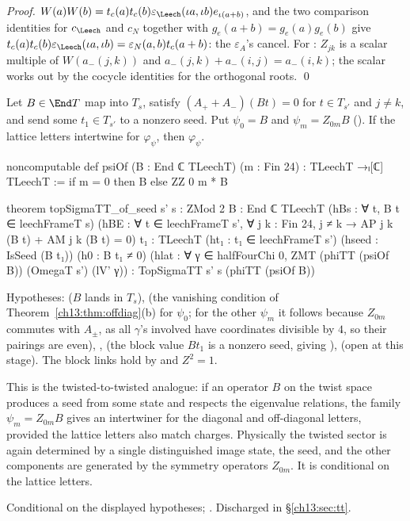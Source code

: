 \noindent\emph{Proof.} $W(a)W(b)=t_c(a)t_c(b)\varepsilon_\Leech(\iota a,\iota b)e_{\iota(a+b)}$, and the two
comparison identities for $c_\Leech$ and $c_N$ together with $g_e(a+b)=g_e(a)g_e(b)$ give
$t_c(a)t_c(b)\varepsilon_\Leech(\iota a,\iota b)=\varepsilon_N(a,b)t_c(a+b)$: the $\varepsilon_A$'s cancel. For : $Z_{jk}$
is a scalar multiple of $W(a_-(j,k))$ and $a_-(j,k)+a_-(i,j)=a_-(i,k)$; the scalar works out by the
cocycle identities for the orthogonal roots. \qed

\begin{theorem}\label{ch13:thm:TT-seed}
Let $B\in\End T$ map into $T_s$, satisfy $(A_++A_-)(B t)=0$ for $t\in T_{s'}$ and $j\neq k$, and send some
$t_1\in T_{s'}$ to a nonzero seed. Put $\psi_0=B$ and $\psi_m=Z_{0m}B$ (). If the lattice
letters intertwine for $\varphi_\psi$, then  $\varphi_\psi$.
\end{theorem}
\begin{leancode}
noncomputable def psiOf (B : End ℂ TLeechT) (m : Fin 24) : TLeechT →ₗ[ℂ] TLeechT :=
  if m = 0 then B else ZZ 0 m * B

theorem topSigmaTT_of_seed {s' s : ZMod 2} {B : End ℂ TLeechT} (hBs : ∀ t, B t ∈ leechFrameT s)
    (hBE : ∀ t ∈ leechFrameT s', ∀ j k : Fin 24, j ≠ k → AP j k (B t) + AM j k (B t) = 0)
    {t₁ : TLeechT} (ht₁ : t₁ ∈ leechFrameT s') (hseed : IsSeed (B t₁)) (h0 : B t₁ ≠ 0)
    (hlat : ∀ γ ∈ halfFourChi 0, ZMT (phiTT (psiOf B)) (OmegaT s') (lV' γ)) :
    TopSigmaTT s' s (phiTT (psiOf B))
\end{leancode}
\begin{dictionary}
Hypotheses:  ($B$ lands in $T_s$),  (the vanishing condition of
Theorem~\ref{ch13:thm:offdiag}(b) for $\psi_0$; for the other $\psi_m$ it follows because $Z_{0m}$
commutes with $A_\pm$, as all $\gamma$'s involved have coordinates divisible by $4$, so their pairings are
even), ,  (the block value $B t_1$ is a nonzero seed, giving ),
 (open at this stage). The block links hold by  and $Z^2=1$.
\end{dictionary}
\begin{physics}
This is the twisted-to-twisted analogue: if an operator $B$ on the twist space produces a seed from some state and respects the eigenvalue relations, the family $\psi_m=Z_{0m}B$ gives an intertwiner for the diagonal and off-diagonal letters, provided the lattice letters also match charges. Physically the twisted sector is again determined by a single distinguished image state, the seed, and the other components are generated by the symmetry operators $Z_{0m}$. It is conditional on the lattice letters.
\end{physics}
\begin{status}Conditional on the displayed hypotheses; . Discharged in
\S\ref{ch13:sec:tt}.\end{status}

